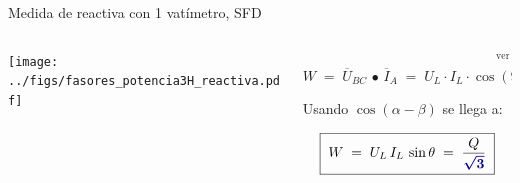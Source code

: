 \documentclass[aspectratio=169, usenames,svgnames,dvipsnames]{beamer}
\begin{document}
\begin{frame}{Medida de reactiva con 1 vatímetro, \hspace{3mm}SFD}
    \begin{columns}
    \begin{column}{0.5\columnwidth}

        \vspace{3mm}
        \texttt{[image: ../figs/fasores\_potencia3H\_reactiva.pdf]}
    \end{column}
    \begin{column}{0.5\columnwidth}    
        \begin{equation*}
    	    W 
            \;=\; 
            \overline{U}_{BC}\,\bullet\,\overline{I}_A
            \;=\;
            U_L \cdot I_L \cdot \overbrace{\cos(90^\circ - \theta)}^{\text{ver gráfico}}
    	\end{equation*}

        \vspace{10mm}
        
        \hspace{3mm}Usando \href{https://raw.githubusercontent.com/ETSIDI-IE/tc/master/docs/diapos/TC1_Trigonometria_Complejos_LBB.pdf}{$\cos(\alpha-\beta)$} se llega a:
        
        \[
            \boxed{\; W
            \;=\; U_L \, I_L \, \sin \theta 
            \;=\; \frac{Q}{\boldsymbol{\color{blue!50!black} \sqrt{3}}} \;}
        \]        
    \end{column}
    \end{columns}
\end{frame}

\end{document}
